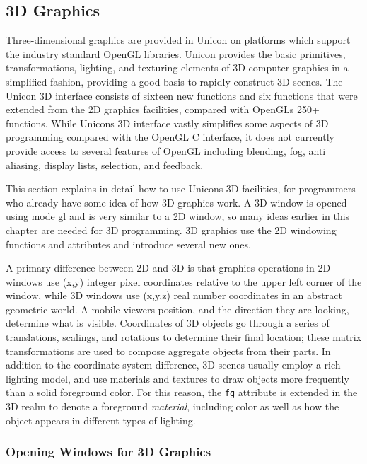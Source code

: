 \subsection{3D Graphics}

Three-dimensional graphics are provided in Unicon on platforms which
support the industry standard OpenGL libraries. Unicon provides the
basic primitives, transformations, lighting, and texturing elements
of 3D computer graphics in a simplified fashion, providing a good basis
to rapidly construct 3D scenes. The Unicon 3D interface consists of
sixteen new functions and six functions that were extended from the 2D
graphics facilities, compared with OpenGL{\textquotesingle}s 250+
functions. While Unicon{\textquotesingle}s 3D interface vastly
simplifies some aspects of 3D programming compared with the OpenGL C
interface, it does not currently provide access to several features of
OpenGL including blending, fog, anti aliasing, display lists,
selection, and feedback.

This section explains in detail how to use Unicon{\textquotesingle}s 3D
facilities, for programmers who already have some idea of how 3D
graphics work. A 3D window is opened using mode
{\textquotedbl}gl{\textquotedbl} and is very similar to a 2D window,
so many ideas earlier in this chapter are needed for 3D
programming. 3D graphics use the 2D windowing functions and attributes
and introduce several new ones.

A primary difference between 2D and 3D is that graphics operations in 2D
windows use (x,y) integer pixel coordinates relative to the
upper left corner of the window, while 3D windows use (x,y,z) real
number coordinates in an abstract geometric world. A mobile
viewer{\textquotesingle}s position, and the direction they are looking,
determine what is visible. Coordinates of 3D objects go through a
series of translations, scalings, and rotations to determine their
final location; these matrix transformations are used to compose
aggregate objects from their parts. In addition to the coordinate
system difference, 3D scenes usually employ a rich lighting model, and
use materials and textures to draw objects more frequently than a solid
foreground color. For this reason, the \texttt{fg} attribute is extended in the
3D realm to denote a foreground \textit{material}, including color as
well as how the object appears in different types of lighting.

\subsubsection{Opening Windows for 3D Graphics}

